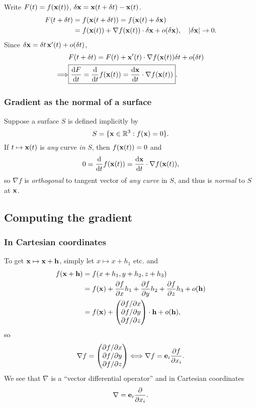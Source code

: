 Write $ F(t) = f({\bf x}(t)) $, $ \delta{\bf x} = {\bf x}(t+\delta t)-{\bf x}(t) $.
\begin{align*}
    F(t+\delta t) &= f({\bf x}(t+\delta t)) = f({\bf x}(t)+\delta {\bf x})\\ 
    &= f({\bf x}(t))+\nabla f({\bf x}(t)) \cdot \delta{\bf x} +o(\delta {\bf x}),\quad |\delta{\bf x}| \to 0.
\end{align*}
Since $ \delta{\bf x} = \delta t\, {\bf x}'(t)+o(\delta t) $, 
\begin{align*}
    &F(t+\delta t)= F(t)+{\bf x}'(t) \cdot \nabla f({\bf x}(t)) \delta t+o(\delta t)\\ 
    \Longrightarrow & \boxed{\frac{\mathrm{d}F}{\mathrm{d}t} = \frac{\mathrm{d}}{\mathrm{d}t}f({\bf x}(t)) = \frac{\mathrm{d}{\bf x}}{\mathrm{d}t} \cdot \nabla f({\bf x}(t))}.
\end{align*}

\subsubsection*{Gradient as the normal of a surface}
Suppose a surface $S$ is defined implicitly by 
\[
    S = \{{\bf x}\in \mathbb{R}^{3}: f({\bf x})=0\}.
\]
If $ t \mapsto {\bf x}(t) $ is \textit{any} curve \textit{in} $S$, then $ f({\bf x}(t))=0 $ and 
\[
    0 = \frac{\mathrm{d}}{\mathrm{d}t}f({\bf x}(t)) =  \frac{\mathrm{d}{\bf x}}{\mathrm{d}t} \cdot \nabla f({\bf x}(t)),
\]
so $ \nabla f $ is \textit{orthogonal} to tangent vector of \textit{any curve} in $S$, and thus is \textit{normal} to $S$ at $ {\bf x} $.

\subsection{Computing the gradient}
\subsubsection*{In Cartesian coordinates}
To get $ {\bf x} \mapsto {\bf x}+{\bf h} $, simply let $ x \mapsto x+h_1 $ etc. and 
\begin{align*}
    f({\bf x}+{\bf h}) &= f(x+h_1,y+h_2,z+h_3)\\ 
    &= f({\bf x}) + \frac{\partial f}{\partial x}h_1+\frac{\partial f}{\partial y}h_2+\frac{\partial f}{\partial z}h_3 +o({\bf h})\\ 
    &= f({\bf x})+ \begin{pmatrix}
        \partial f/\partial x  \\ \partial f/\partial y  \\ \partial f/\partial z 
    \end{pmatrix}\cdot {\bf h}+o({\bf h}),
\end{align*}
so 
\[
    \nabla f = \begin{pmatrix}
        \partial f/\partial x  \\ \partial f/\partial y  \\ \partial f/\partial z 
    \end{pmatrix} \Longleftrightarrow \nabla f = {\bf e}_i \frac{\partial f}{\partial x_i}.
\]
We see that $ \nabla $ is a ``vector differential operator'' and in Cartesian coordinates
\[
    \nabla = {\bf e}_i \frac{\partial }{\partial x_i} . 
\]

